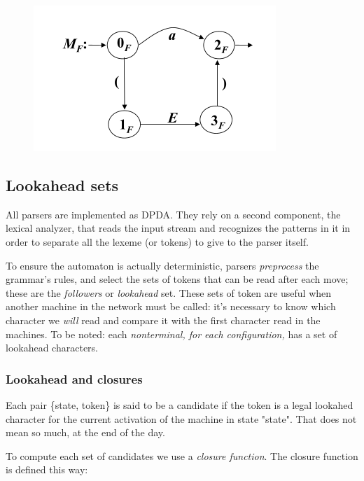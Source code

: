 				\begin{figure}[htp]
					\begin{center}
						\includegraphics[]{./images/exF.png}
					\end{center}
				\end{figure}
				
		\subsection{Lookahead sets}
			All parsers are implemented as DPDA. They rely on a second component, the lexical analyzer, that reads the input stream and recognizes the patterns in it 
			in order to separate all the lexeme (or tokens) to give to the parser itself.

			To ensure the automaton is actually deterministic, parsers \emph{preprocess} the grammar's rules, and select the sets of tokens that can be read after 
			each move; these are the \emph{followers} or \emph{lookahead} set. These sets of token are useful when another machine in the network must be called: 
			it's necessary to know which character we \emph{will} read and compare it with the first character read in the machines. To be noted: each 
			\emph{nonterminal, for each configuration,} has a set of lookahead characters. 
			
			\subsubsection{Lookahead and closures}
				Each pair \{state, token\} is said to be a candidate if the token is a legal lookahed character for the current activation of the machine in state 
				"state". That does not mean so much, at the end of the day.

				To compute each set of candidates we use a \emph{closure function}. The closure function is defined this way:

